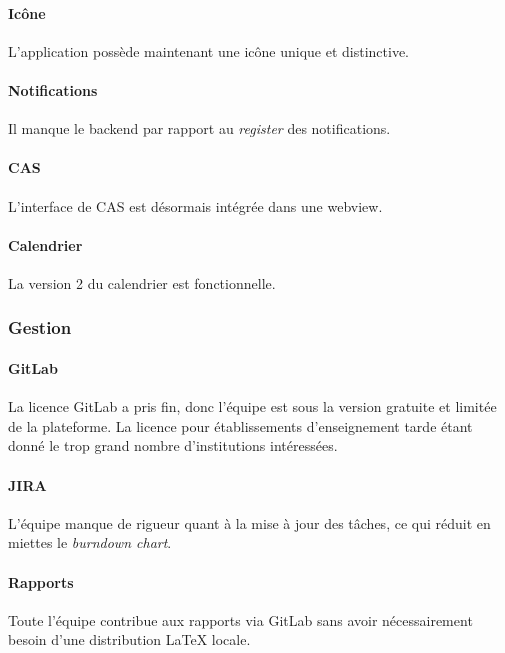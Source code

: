 	\paragraph{Icône} L'application possède maintenant une icône unique et distinctive.
	
	\paragraph{Notifications} Il manque le backend par rapport au \emph{register} des notifications.
	
	\paragraph{CAS} L'interface de CAS est désormais intégrée dans une webview.
	
	\paragraph{Calendrier} La version 2 du calendrier est fonctionnelle.

\subsubsection{Gestion}

	\paragraph{GitLab} La licence GitLab a pris fin, donc l'équipe est sous la version gratuite et limitée de la plateforme. La licence pour établissements d'enseignement tarde étant donné le trop grand nombre d'institutions intéressées.
	
	\paragraph{JIRA} L'équipe manque de rigueur quant à la mise à jour des tâches, ce qui réduit en miettes le \emph{burndown chart}.
	
	\paragraph{Rapports} Toute l'équipe contribue aux rapports via GitLab sans avoir nécessairement besoin d'une distribution \LaTeX{} locale.
	
	
